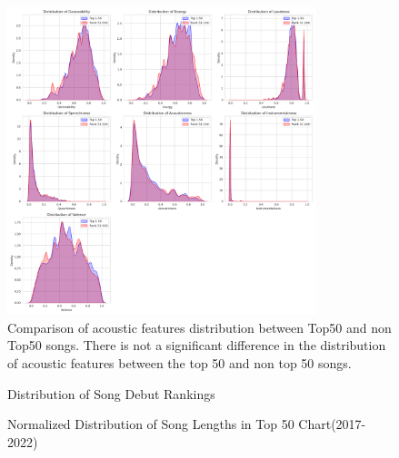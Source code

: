\documentclass{article}
\begin{document}
\begin{figure}[h] %
  \centering
  \includegraphics[width=0.8\textwidth]{distribute.png}
  \captionsetup{labelformat=default}
  \caption{Comparison of acoustic features distribution between Top50 and non Top50 songs. There is not a significant difference in the distribution of acoustic features between the top 50 and non top 50 songs.}
  \label{fig:distribute}
\end{figure}

\begin{figure}[h]
  \centering
  
  \captionsetup{labelformat=default}
  \caption{Distribution of Song Debut Rankings}
  \label{fig:debut}
\end{figure}

\begin{figure}[h]
  \centering
  
  \caption{Normalized Distribution of Song Lengths in Top 50 Chart(2017-2022)}
  \label{fig:length}

  
\end{figure}
\end{document}
